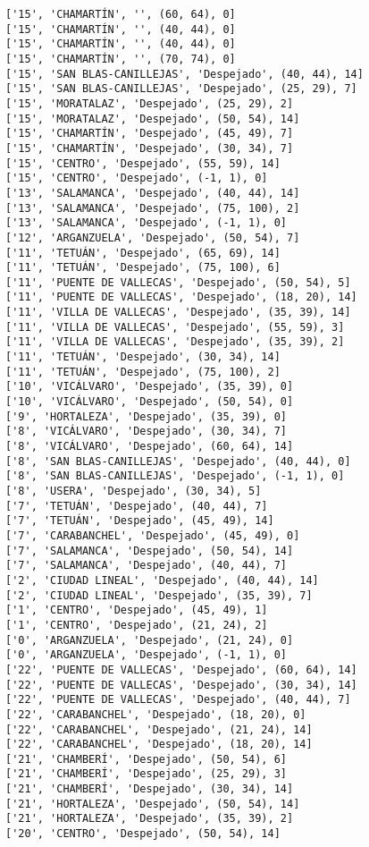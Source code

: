 \documentclass[11pt]{article}
\begin{document}
\begin{Verbatim}[commandchars=\\\{\}]
['15', 'CHAMARTÍN', '', (60, 64), 0]
['15', 'CHAMARTÍN', '', (40, 44), 0]
['15', 'CHAMARTÍN', '', (40, 44), 0]
['15', 'CHAMARTÍN', '', (70, 74), 0]
['15', 'SAN BLAS-CANILLEJAS', 'Despejado', (40, 44), 14]
['15', 'SAN BLAS-CANILLEJAS', 'Despejado', (25, 29), 7]
['15', 'MORATALAZ', 'Despejado', (25, 29), 2]
['15', 'MORATALAZ', 'Despejado', (50, 54), 14]
['15', 'CHAMARTÍN', 'Despejado', (45, 49), 7]
['15', 'CHAMARTÍN', 'Despejado', (30, 34), 7]
['15', 'CENTRO', 'Despejado', (55, 59), 14]
['15', 'CENTRO', 'Despejado', (-1, 1), 0]
['13', 'SALAMANCA', 'Despejado', (40, 44), 14]
['13', 'SALAMANCA', 'Despejado', (75, 100), 2]
['13', 'SALAMANCA', 'Despejado', (-1, 1), 0]
['12', 'ARGANZUELA', 'Despejado', (50, 54), 7]
['11', 'TETUÁN', 'Despejado', (65, 69), 14]
['11', 'TETUÁN', 'Despejado', (75, 100), 6]
['11', 'PUENTE DE VALLECAS', 'Despejado', (50, 54), 5]
['11', 'PUENTE DE VALLECAS', 'Despejado', (18, 20), 14]
['11', 'VILLA DE VALLECAS', 'Despejado', (35, 39), 14]
['11', 'VILLA DE VALLECAS', 'Despejado', (55, 59), 3]
['11', 'VILLA DE VALLECAS', 'Despejado', (35, 39), 2]
['11', 'TETUÁN', 'Despejado', (30, 34), 14]
['11', 'TETUÁN', 'Despejado', (75, 100), 2]
['10', 'VICÁLVARO', 'Despejado', (35, 39), 0]
['10', 'VICÁLVARO', 'Despejado', (50, 54), 0]
['9', 'HORTALEZA', 'Despejado', (35, 39), 0]
['8', 'VICÁLVARO', 'Despejado', (30, 34), 7]
['8', 'VICÁLVARO', 'Despejado', (60, 64), 14]
['8', 'SAN BLAS-CANILLEJAS', 'Despejado', (40, 44), 0]
['8', 'SAN BLAS-CANILLEJAS', 'Despejado', (-1, 1), 0]
['8', 'USERA', 'Despejado', (30, 34), 5]
['7', 'TETUÁN', 'Despejado', (40, 44), 7]
['7', 'TETUÁN', 'Despejado', (45, 49), 14]
['7', 'CARABANCHEL', 'Despejado', (45, 49), 0]
['7', 'SALAMANCA', 'Despejado', (50, 54), 14]
['7', 'SALAMANCA', 'Despejado', (40, 44), 7]
['2', 'CIUDAD LINEAL', 'Despejado', (40, 44), 14]
['2', 'CIUDAD LINEAL', 'Despejado', (35, 39), 7]
['1', 'CENTRO', 'Despejado', (45, 49), 1]
['1', 'CENTRO', 'Despejado', (21, 24), 2]
['0', 'ARGANZUELA', 'Despejado', (21, 24), 0]
['0', 'ARGANZUELA', 'Despejado', (-1, 1), 0]
['22', 'PUENTE DE VALLECAS', 'Despejado', (60, 64), 14]
['22', 'PUENTE DE VALLECAS', 'Despejado', (30, 34), 14]
['22', 'PUENTE DE VALLECAS', 'Despejado', (40, 44), 7]
['22', 'CARABANCHEL', 'Despejado', (18, 20), 0]
['22', 'CARABANCHEL', 'Despejado', (21, 24), 14]
['22', 'CARABANCHEL', 'Despejado', (18, 20), 14]
['21', 'CHAMBERÍ', 'Despejado', (50, 54), 6]
['21', 'CHAMBERÍ', 'Despejado', (25, 29), 3]
['21', 'CHAMBERÍ', 'Despejado', (30, 34), 14]
['21', 'HORTALEZA', 'Despejado', (50, 54), 14]
['21', 'HORTALEZA', 'Despejado', (35, 39), 2]
['20', 'CENTRO', 'Despejado', (50, 54), 14]

\end{Verbatim}
\end{document}
